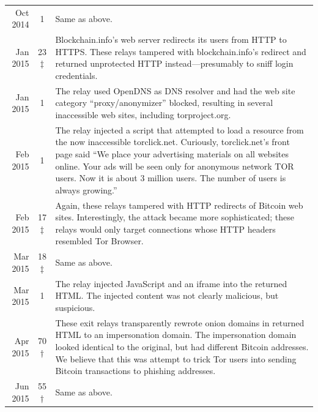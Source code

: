 \begin{table}[t]
\begin{tabular}{r c p{10cm}}
Oct 2014 & 1 & Same as above. \\

Jan 2015 & 23$\ddagger$ & Blockchain.info's web server redirects its
users from HTTP to HTTPS.  These relays tampered with blockchain.info's redirect
and returned unprotected HTTP instead---presumably to sniff login credentials. \\

Jan 2015 & 1 & The relay used OpenDNS as DNS resolver and had the web site
category ``proxy/anonymizer'' blocked, resulting in several inaccessible web
sites, including torproject.org. \\

Feb 2015 & 1 & The relay injected a script that attempted to load a resource
from the now inaccessible torclick.net.  Curiously, torclick.net's front page
said ``We place your advertising materials on all websites online.  Your ads
will be seen only for anonymous network TOR users.  Now it is about 3 million
users. The number of users is always growing.'' \\

Feb 2015 & 17$\ddagger$ & Again, these relays tampered with HTTP redirects of
Bitcoin web sites.  Interestingly, the attack became more sophisticated; these
relays would only target connections whose HTTP headers resembled Tor Browser.
\\

Mar 2015 & 18$\ddagger$ & Same as above. \\

Mar 2015 & 1 & The relay injected JavaScript and an iframe into the returned
HTML.  The injected content was not clearly malicious, but suspicious. \\

Apr 2015 & 70$\dagger$ & These exit relays transparently rewrote onion domains
in returned HTML to an impersonation domain.  The impersonation domain looked
identical to the original, but had different Bitcoin addresses.  We believe that
this was attempt to trick Tor users into sending Bitcoin transactions to
phishing addresses. \\

Jun 2015 & 55$\dagger$ & Same as above. \\


\end{tabular}
\end{table}
